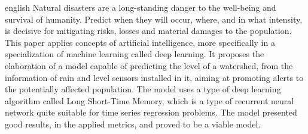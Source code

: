 \begin{resumo}[ABSTRACT]
 \begin{otherlanguage*}{english}
\hspace{1.5cm} Natural disasters are a long-standing danger to the well-being and survival of humanity. Predict when they will occur, where, and in what intensity, is decisive for mitigating risks, losses and material damages to the population. This paper applies concepts of artificial intelligence, more specifically in a specialization of machine learning called deep learning. It proposes the elaboration of a model capable of predicting the level of a watershed, from the information of rain and level sensors installed in it, aiming at promoting alerts to the potentially affected population. The model uses a type of deep learning algorithm called Long Short-Time Memory, which is a type of recurrent neural network quite suitable for time series regression problems. The model presented good results, in the applied metrics, and proved to be a viable model.

 \end{otherlanguage*}
\end{resumo}